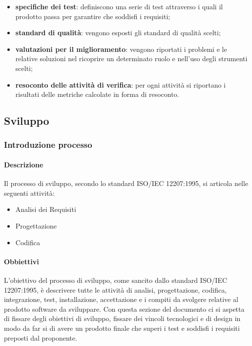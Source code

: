 \begin{itemize}
\begin{itemize}
							\item\textbf{specifiche dei test}: definiscono una serie di test attraverso i quali il prodotto passa per garantire che soddisfi i requisiti;
							\item\textbf{standard di qualità}: vengono esposti gli standard di qualità scelti;
							\item\textbf{valutazioni per il miglioramento}: vengono riportati i problemi e le relative soluzioni nel ricoprire un determinato ruolo e nell'uso degli strumenti scelti;
							\item\textbf{resoconto delle attività di verifica}: per ogni attività si riportano i risultati delle metriche calcolate in forma di resoconto.
						\end{itemize}
				\end{itemize}
	\subsection{Sviluppo}
		\subsubsection{Introduzione processo}
			\paragraph{Descrizione}
				Il processo di sviluppo, secondo lo standard ISO/IEC 12207:1995, si articola nelle seguenti attività:\\
				\begin{itemize}
					\item Analisi dei Requisiti
					\item Progettazione
					\item Codifica
				\end{itemize}
			\paragraph{Obbiettivi}
				L'obiettivo del processo di sviluppo, come sancito dallo standard ISO/IEC 12207:1995, è descrivere tutte le attività di analisi, progettazione, codifica, integrazione, test, installazione, accettazione e i compiti da svolgere relative al prodotto software da sviluppare. Con questa sezione del documento ci si aspetta di fissare degli obiettivi di sviluppo, fissare dei vincoli tecnologici e di design in modo da far si di avere un prodotto finale che superi i test e soddisfi i requisiti preposti dal proponente.\\

